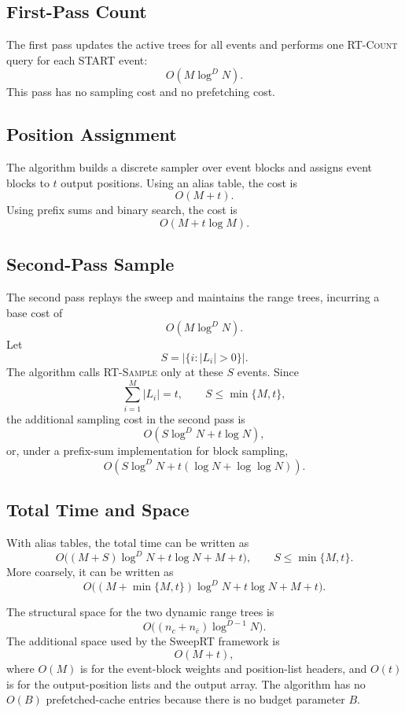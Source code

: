 \documentclass[11pt]{article}
\begin{document}
\subsection{First-Pass Count}

The first pass updates the active trees for all events and performs one \textsc{RT-Count} query for each START event:
\[
 O(M\log^D N).
\]
This pass has no sampling cost and no prefetching cost.

\subsection{Position Assignment}

The algorithm builds a discrete sampler over event blocks and assigns event blocks to \(t\) output positions. Using an alias table, the cost is
\[
 O(M+t).
\]
Using prefix sums and binary search, the cost is
\[
 O(M+t\log M).
\]

\subsection{Second-Pass Sample}

The second pass replays the sweep and maintains the range trees, incurring a base cost of
\[
 O(M\log^D N).
\]
Let
\[
 S=|\{i: |L_i|>0\}|.
\]
The algorithm calls \textsc{RT-Sample} only at these \(S\) events. Since
\[
 \sum_{i=1}^{M}|L_i|=t,
 \qquad
 S\le \min\{M,t\},
\]
the additional sampling cost in the second pass is
\[
 O(S\log^D N+t\log N),
\]
or, under a prefix-sum implementation for block sampling,
\[
 O(S\log^D N+t(\log N+\log\log N)).
\]

\subsection{Total Time and Space}

With alias tables, the total time can be written as
\[
 O\bigl((M+S)\log^D N+t\log N+M+t\bigr),
 \qquad S\le\min\{M,t\}.
\]
More coarsely, it can be written as
\[
 O\bigl((M+\min\{M,t\})\log^D N+t\log N+M+t\bigr).
\]

The structural space for the two dynamic range trees is
\[
 O\bigl((n_c+n_{\bar c})\log^{D-1}N\bigr).
\]
The additional space used by the SweepRT framework is
\[
 O(M+t),
\]
where \(O(M)\) is for the event-block weights and position-list headers, and \(O(t)\) is for the output-position lists and the output array. The algorithm has no \(O(B)\) prefetched-cache entries because there is no budget parameter \(B\).
\end{document}
